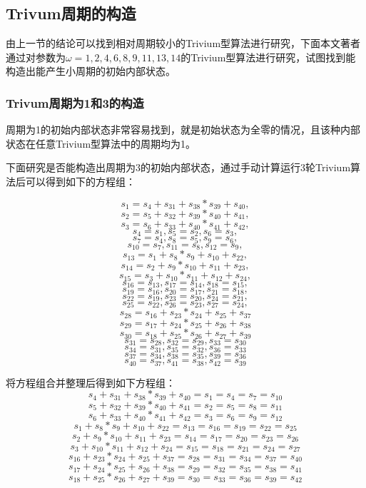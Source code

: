 \subsection{Trivum周期的构造}

由上一节的结论可以找到相对周期较小的Trivium型算法进行研究，下面本文著者通过对参数为$\omega={1, 2, 4, 6, 8, 9, 11, 13, 14}$的Trivium型算法进行研究，试图找到能构造出能产生小周期的初始内部状态。

\subsubsection{Trivum周期为1和3的构造}

周期为1的初始内部状态非常容易找到，就是初始状态为全零的情况，且该种内部状态在任意Trivium型算法中的周期均为1。

下面研究是否能构造出周期为3的初始内部状态，通过手动计算运行3轮Trivium算法后可以得到如下的方程组：

\[s_{1}=s_{4}+s_{31}+s_{38}*s_{39}+s_{40},\]
\[s_{2}=s_{5}+s_{32}+s_{39}*s_{40}+s_{41},\]
\[s_{3}=s_{6}+s_{33}+s_{40}*s_{41}+s_{42},\]
\[s_{4}=s_{1},s_{5}=s_{2},s_{6}=s_{3},\]
\[s_{7}=s_{4},s_{8}=s_{5},s_{9}=s_{6},\]
\[s_{10}=s_{7},s_{11}=s_{8},s_{12}=s_{9},\]
\[s_{13}=s_{1}+s_{8}*s_{9}+s_{10}+s_{22},\]
\[s_{14}=s_{2}+s_{9}*s_{10}+s_{11}+s_{23},\]
\[s_{15}=s_{3}+s_{10}*s_{11}+s_{12}+s_{24},\]
\[s_{16}=s_{13},s_{17}=s_{14},s_{18}=s_{15},\]
\[s_{19}=s_{16},s_{20}=s_{17},s_{21}=s_{18},\]
\[s_{22}=s_{19},s_{23}=s_{20},s_{24}=s_{21},\]
\[s_{25}=s_{22},s_{26}=s_{23},s_{27}=s_{24},\]
\[s_{28}=s_{16}+s_{23}*s_{24}+s_{25}+s_{37}\]
\[s_{29}=s_{17}+s_{24}*s_{25}+s_{26}+s_{38}\]
\[s_{30}=s_{18}+s_{25}*s_{26}+s_{27}+s_{39}\]
\[s_{31}=s_{28},s_{32}=s_{29},s_{33}=s_{30}\]
\[s_{34}=s_{31},s_{35}=s_{32},s_{36}=s_{33}\]
\[s_{37}=s_{34},s_{38}=s_{35},s_{39}=s_{36}\]
\[s_{40}=s_{37},s_{41}=s_{38},s_{42}=s_{39}\]

将方程组合并整理后得到如下方程组：
\[s_{4}+s_{31}+s_{38}*s_{39}+s_{40}=s_{1}=s_{4}=s_{7}=s_{10}\]
\[s_{5}+s_{32}+s_{39}*s_{40}+s_{41}=s_{2}=s_{5}=s_{8}=s_{11}\]
\[s_{6}+s_{33}+s_{40}*s_{41}+s_{42}=s_{3}=s_{6}=s_{9}=s_{12}\]
\[s_{1}+s_{8}*s_{9}+s_{10}+s_{22}=s_{13}=s_{16}=s_{19}=s_{22}=s_{25}\]
\[s_{2}+s_{9}*s_{10}+s_{11}+s_{23}=s_{14}=s_{17}=s_{20}=s_{23}=s_{26}\]
\[s_{3}+s_{10}*s_{11}+s_{12}+s_{24}=s_{15}=s_{18}=s_{21}=s_{24}=s_{27}\]
\[s_{16}+s_{23}*s_{24}+s_{25}+s_{37}=s_{28}=s_{31}=s_{34}=s_{37}=s_{40}\]
\[s_{17}+s_{24}*s_{25}+s_{26}+s_{38}=s_{29}=s_{32}=s_{35}=s_{38}=s_{41}\]
\[s_{18}+s_{25}*s_{26}+s_{27}+s_{39}=s_{30}=s_{33}=s_{36}=s_{39}=s_{42}\]

